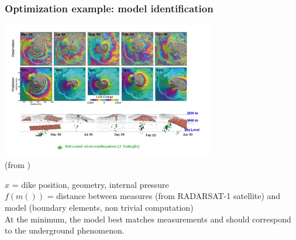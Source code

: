 \documentclass[12pt]{beamer}
\begin{document}
\begin{frame}
\frametitle{Optimization example: model identification}
\begin{center}
\includegraphics[width=0.7\textwidth]{piton_fournaise.jpg}\\
\vspace{-1cm}
{\hfill\tiny (from \cite{fukushima2010evolution})}
\end{center}
$x$ = dike position, geometry, internal pressure\\
$f(m())$ = distance between measures (from RADARSAT-1 satellite) and model (boundary elements, non trivial computation)\\
At the minimum, the model best matches measurements and should correspond to the underground phenomenon.
\end{frame}
\end{document}
